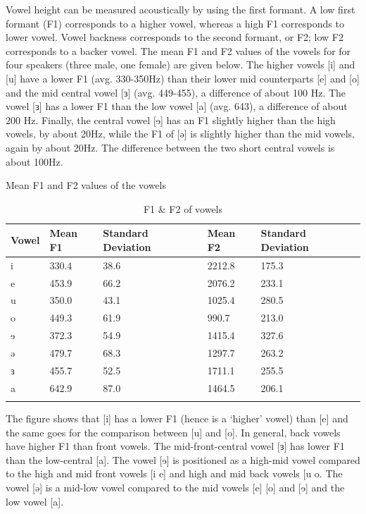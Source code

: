 Vowel height can be measured acoustically by using the first formant. A low first formant (F1) corresponds to a higher vowel, whereas a high F1 corresponds to lower vowel. Vowel backness corresponds to the second formant, or F2; low F2 corresponds to a backer vowel. The mean F1 and F2 values of the vowels for for four speakers (three male, one female) are given below. The higher vowels [i] and [u] have a lower F1 (avg. 330-350Hz)  than their lower mid counterparts [e] and [o] and the mid central vowel [ɜ] (avg. 449-455), a difference of about 100 Hz. The vowel [ɜ] has a lower F1 than the low vowel [a] (avg. 643), a difference of about 200 Hz. Finally, the  central vowel [ɘ] has an F1 slightly higher than the high vowels, by about 20Hz, while the F1 of [ə] is slightly higher than the mid vowels, again by about 20Hz. The difference between the two short central vowels is about 100Hz. 

Mean F1 and F2 values of the vowels 
\begin{table}
  \begin{tabular}{lllll}
    \lsptoprule
	Vowel &	Mean F1 &	Standard Deviation	&	Mean F2 &	Standard Deviation	\\
	\midrule
	i	&   330.4	&	38.6		&	2212.8	&	175.3 \\
	e	&	453.9 	&	66.2		&	2076.2	&	  233.1	\\
	u	&	350.0	&	43.1		&	1025.4	&	280.5	\\
	o	&	449.3 	&	61.9		&	990.7	&	213.0	\\
	ɘ	&	372.3	&	54.9		&	1415.4	&	327.6	\\
	ə	&	479.7 	&	68.3		&	1297.7	&	263.2	\\
	ɜ	&	455.7	&	52.5		&	1711.1	&	255.5	\\
	a	&	642.9 	&	87.0		&	1464.5	&	206.1	\\
\lspbottomrule
  \end{tabular}
  \caption{F1 \& F2 of vowels}
  \label{tab:ch2:2}
\end{table}


The figure shows that [i] has a lower F1 (hence is a ‘higher’ vowel) than [e] and the same goes for the comparison between [u] and [o]. In general, back vowels have higher F1 than front vowels. The mid-front-central vowel [ɜ] has lower F1 than the low-central [a]. The vowel [ɘ] is positioned as a high-mid vowel compared to the high and mid front vowels [i e] and high and mid back vowels [u o. The vowel [ə] is a mid-low vowel compared to the mid vowels [e] [o] and [ɘ] and the low vowel [a]. 

